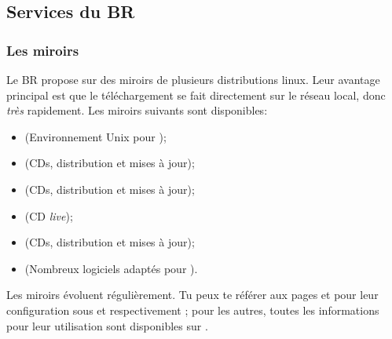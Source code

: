 \subsection{Services du BR}


\subsubsection{Les miroirs}
Le BR propose sur  des miroirs de plusieurs distributions linux. Leur avantage principal est que le téléchargement se fait directement sur le réseau local, donc \emph{très} rapidement.
Les miroirs suivants sont disponibles:

\begin{itemize}
\item {} (Environnement Unix pour );
\item {} (CDs, distribution et mises à jour);
\item {} (CDs, distribution et mises à jour);
\item {} (CD \emph{live});
\item {} (CDs, distribution et mises à jour);
\item {} (Nombreux logiciels  adaptés pour ).
\end{itemize}


Les miroirs évoluent régulièrement. Tu peux te référer aux pages \pageref{gentoo_mirror} et \pageref{ubuntu_mirror} pour leur configuration sous  et  respectivement ; pour les autres, toutes les informations pour leur utilisation sont disponibles sur .
